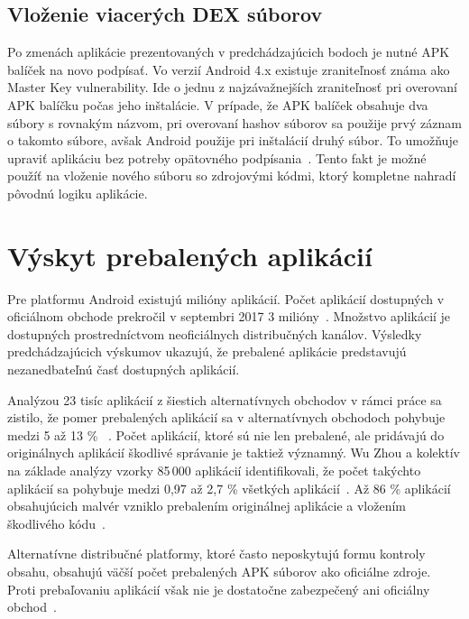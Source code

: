 \subsection*{Vloženie viacerých DEX súborov}
Po zmenách aplikácie prezentovaných v predchádzajúcich bodoch je nutné APK balíček na novo podpísať. Vo verzií Android 4.x existuje zraniteľnosť známa ako Master Key vulnerability. Ide o jednu z najzávažnejších zraniteľnosť pri overovaní APK balíčku počas jeho inštalácie. V prípade, že APK balíček obsahuje dva súbory s rovnakým názvom, pri overovaní hashov súborov sa použije prvý záznam o takomto súbore, avšak Android použije pri inštalácií druhý súbor. To umožňuje upraviť aplikáciu bez potreby opätovného podpísania~\cite{c2gYRVCI9leJhfOJ}. Tento fakt je možné použíť na vloženie nového súboru so zdrojovými kódmi, ktorý kompletne nahradí pôvodnú logiku aplikácie.

\section{Výskyt prebalených aplikácií}
Pre platformu Android existujú milióny aplikácií. Počet aplikácií dostupných v oficiálnom obchode  prekročil v septembri 2017 3 milióny~\cite{Statista}. Množstvo aplikácií je dostupných prostredníctvom neoficiálnych distribučných kanálov.  Výsledky predchádzajúcich výskumov ukazujú, že prebalené aplikácie predstavujú nezanedbateľnú časť dostupných aplikácií.

Analýzou 23 tisíc aplikácií z šiestich alternatívnych obchodov v rámci práce  sa zistilo, že pomer prebalených aplikácií sa v alternatívnych obchodoch pohybuje medzi 5 až 13 \% ~\cite{DetectingRepackagedZhou}.
Počet aplikácií, ktoré sú nie len prebalené, ale pridávajú do originálnych aplikácií škodlivé správanie je taktiež významný. Wu Zhou a kolektív na základe analýzy vzorky 85\,000 aplikácií identifikovali, že počet takýchto aplikácií sa pohybuje medzi 0,97 až 2,7 \% všetkých aplikácií~\cite{Zhou2013}.
Až 86 \% aplikácií obsahujúcich malvér vzniklo prebalením originálnej aplikácie a vložením škodlivého kódu~\cite{androidThreats}.

Alternatívne distribučné platformy, ktoré často neposkytujú formu kontroly obsahu, obsahujú väčší počet prebalených APK súborov ako oficiálne zdroje. Proti prebaľovaniu aplikácií však nie je dostatočne zabezpečený ani oficiálny obchod~\cite{Zhauniarovich2013}. 
